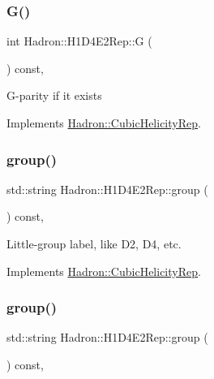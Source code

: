 \subsubsection{\texorpdfstring{G()}{G()}\hspace{0.1cm}{\footnotesize\ttfamily [3/3]}}
{\footnotesize\ttfamily int Hadron\+::\+H1\+D4\+E2\+Rep\+::G (\begin{DoxyParamCaption}{ }\end{DoxyParamCaption}) const\hspace{0.3cm}{\ttfamily [inline]}, {\ttfamily [virtual]}}

G-\/parity if it exists 

Implements \mbox{\hyperlink{structHadron_1_1CubicHelicityRep_a50689f42be1e6170aa8cf6ad0597018b}{Hadron\+::\+Cubic\+Helicity\+Rep}}.

\mbox{\label{structHadron_1_1H1D4E2Rep_a136d615d32a53559950775a7e07d5650}} 
\subsubsection{\texorpdfstring{group()}{group()}\hspace{0.1cm}{\footnotesize\ttfamily [1/5]}}
{\footnotesize\ttfamily std\+::string Hadron\+::\+H1\+D4\+E2\+Rep\+::group (\begin{DoxyParamCaption}{ }\end{DoxyParamCaption}) const\hspace{0.3cm}{\ttfamily [inline]}, {\ttfamily [virtual]}}

Little-\/group label, like D2, D4, etc. 

Implements \mbox{\hyperlink{structHadron_1_1CubicHelicityRep_a101a7d76cd8ccdad0f272db44b766113}{Hadron\+::\+Cubic\+Helicity\+Rep}}.

\mbox{\label{structHadron_1_1H1D4E2Rep_a136d615d32a53559950775a7e07d5650}} 
\subsubsection{\texorpdfstring{group()}{group()}\hspace{0.1cm}{\footnotesize\ttfamily [2/5]}}
{\footnotesize\ttfamily std\+::string Hadron\+::\+H1\+D4\+E2\+Rep\+::group (\begin{DoxyParamCaption}{ }\end{DoxyParamCaption}) const\hspace{0.3cm}{\ttfamily [inline]}, {\ttfamily [virtual]}}

